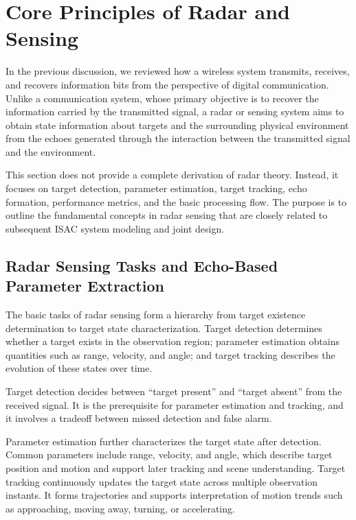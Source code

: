 \section{Core Principles of Radar and Sensing}
\label{sec:radar_sensing_fundamentals}

In the previous discussion, we reviewed how a wireless system transmits,
receives, and recovers information bits from the perspective of digital
communication.
Unlike a communication system, whose primary objective is to recover the
information carried by the transmitted signal, a radar or sensing system aims
to obtain state information about targets and the surrounding physical
environment from the echoes generated through the interaction between the
transmitted signal and the environment.

This section does not provide a complete derivation of radar theory.
Instead, it focuses on target detection, parameter estimation, target tracking,
echo formation, performance metrics, and the basic processing flow.
The purpose is to outline the fundamental concepts in radar sensing that are
closely related to subsequent ISAC system modeling and joint design.

\subsection{Radar Sensing Tasks and Echo-Based Parameter Extraction}


The basic tasks of radar sensing form a hierarchy from target existence
determination to target state characterization.
Target detection determines whether a target exists in the observation region;
parameter estimation obtains quantities such as range, velocity, and angle; and
target tracking describes the evolution of these states over time.

Target detection decides between ``target present'' and ``target absent'' from
the received signal.
It is the prerequisite for parameter estimation and tracking, and it involves a
tradeoff between missed detection and false alarm.

Parameter estimation further characterizes the target state after detection.
Common parameters include range, velocity, and angle, which describe target
position and motion and support later tracking and scene understanding.
Target tracking continuously updates the target state across multiple
observation instants.
It forms trajectories and supports interpretation of motion trends such as
approaching, moving away, turning, or accelerating.

